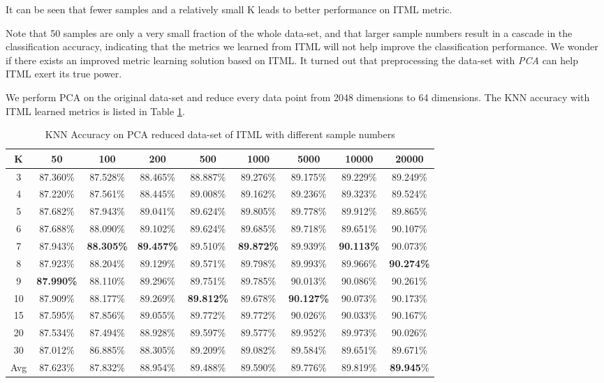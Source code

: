 It can be seen that fewer samples and a relatively small K leads to better performance on ITML metric.

Note that 50 samples are only a very small fraction of the whole data-set, and that larger sample numbers result in a cascade in the classification accuracy, indicating that the metrics we learned from ITML will not help improve the classification performance. We wonder if there exists an improved metric learning solution based on ITML. It turned out that preprocessing the data-set with \emph{PCA} can help ITML exert its true power.

We perform PCA on the original data-set and reduce every data point from 2048 dimensions to 64 dimensions. The KNN accuracy with ITML learned metrics is listed in Table \ref{tab:itml2}.

\begin{table}[h]
\centering
\caption{KNN Accuracy on PCA reduced data-set of ITML with different sample numbers \label{tab:itml2}}
\footnotesize
\begin{tabular}{ccccccccc}
\hline
K   & 50       & 100      & 200      & 500      & 1000     & 5000     & 10000    & 20000    \\ \hline
3   & 87.360\% & 87.528\% & 88.465\% & 88.887\% & 89.276\% & 89.175\% & 89.229\% & 89.249\% \\
4   & 87.220\% & 87.561\% & 88.445\% & 89.008\% & 89.162\% & 89.236\% & 89.323\% & 89.524\% \\
5   & 87.682\% & 87.943\% & 89.041\% & 89.624\% & 89.805\% & 89.778\% & 89.912\% & 89.865\% \\
6   & 87.688\% & 88.090\% & 89.102\% & 89.624\% & 89.685\% & 89.718\% & 89.651\% & 90.107\% \\
7   & 87.943\% & \textbf{88.305\%} & \textbf{89.457\%} & 89.510\% & \textbf{89.872\%} & 89.939\% & \textbf{90.113\%} & 90.073\% \\
8   & 87.923\% & 88.204\% & 89.129\% & 89.571\% & 89.798\% & 89.993\% & 89.966\% & \textbf{90.274\%} \\
9   & \textbf{87.990\%} & 88.110\% & 89.296\% & 89.751\% & 89.785\% & 90.013\% & 90.086\% & 90.261\% \\
10  & 87.909\% & 88.177\% & 89.269\% & \textbf{89.812\%} & 89.678\% & \textbf{90.127\%} & 90.073\% & 90.173\% \\
15  & 87.595\% & 87.856\% & 89.055\% & 89.772\% & 89.772\% & 90.026\% & 90.033\% & 90.167\% \\
20  & 87.534\% & 87.494\% & 88.928\% & 89.597\% & 89.577\% & 89.952\% & 89.973\% & 90.026\% \\
30  & 87.012\% & 86.885\% & 88.305\% & 89.209\% & 89.082\% & 89.584\% & 89.651\% & 89.671\% \\ \hline
Avg & 87.623\% & 87.832\% & 88.954\% & 89.488\% & 89.590\% & 89.776\% & 89.819\% & \textbf{89.945}\% \\ \hline
\end{tabular}
\end{table}

